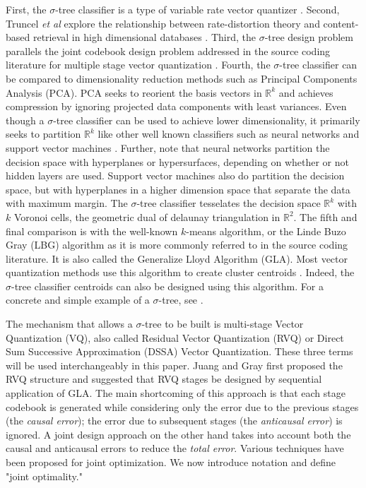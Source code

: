 \documentclass{article}
\begin{document}
First, the $\sigma$-tree classifier is a type of variable rate vector quantizer \cite{2003_JNL_HighRateVQDetection_Hero}.  Second, Truncel \emph{et al} explore the relationship between rate-distortion theory and content-based retrieval in high dimensional databases \cite{2004_JNL_RateDistortionVsDatabases_Truncel}.  Third, the $\sigma$-tree design problem parallels the joint codebook design problem addressed in the source coding literature for multiple stage vector quantization \cite{1996_JNL_AdvancesRVQ_Barnes}.  Fourth, the $\sigma$-tree classifier can be compared to dimensionality reduction methods such as Principal Components Analysis (PCA).  PCA seeks to reorient the basis vectors in $\mathbb{R}^k$ and achieves compression by ignoring projected data components with least variances.  Even though a $\sigma$-tree classifier can be used to achieve lower dimensionality, it primarily seeks to partition $\mathbb{R}^k$ like other well known classifiers such as neural networks and support vector machines \cite{2007_JNL_IDDM_Barnes}.  Further, note that neural networks partition the decision space with hyperplanes or hypersurfaces, depending on whether or not hidden layers are used.  Support vector machines also do partition the decision space, but with hyperplanes in a higher dimension space that separate the data with maximum margin.  The $\sigma$-tree classifier tesselates the decision space $\mathbb{R}^k$ with $k$ Voronoi cells, the geometric dual of delaunay triangulation in $\mathbb{R}^2$.  The fifth and final comparison is with the well-known $k$-means algorithm, or the Linde Buzo Gray (LBG) algorithm as it is more commonly referred to in the source coding literature.  It is also called the Generalize Lloyd Algorithm (GLA).  Most vector quantization methods use this algorithm to create cluster centroids \cite{1991_BOOK_VQ_GershoGray}.  Indeed, the $\sigma$-tree classifier centroids can also be designed using this algorithm.  For a concrete and simple example of a $\sigma$-tree, see \cite{2007_JNL_IDDM_Barnes}.


The mechanism that allows a $\sigma$-tree to be built is multi-stage Vector Quantization (VQ), also called Residual Vector Quantization (RVQ) or Direct Sum Successive Approximation (DSSA) Vector Quantization.  These three terms will be used interchangeably in this paper.  Juang and Gray first proposed the RVQ structure \cite{1982_CNF_SpeechRVQ_JuangGray} and suggested that RVQ stages be designed by sequential application of GLA.  The main shortcoming of this approach is that each stage codebook is generated while considering only the error due to the previous stages (the \emph{causal error}); the error due to subsequent stages (the \emph{anticausal error}) is ignored.  A joint design approach on the other hand takes into account both the causal and anticausal errors to reduce the \emph{total error}.  Various techniques have been proposed for joint optimization.  We now introduce notation and define "joint optimality."
\end{document}
